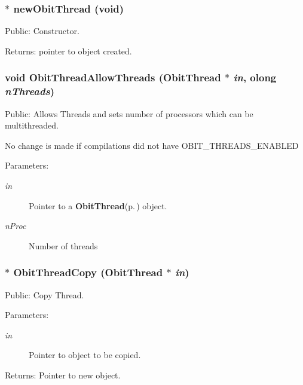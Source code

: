 \subsubsection{$\ast$ new\-Obit\-Thread (void)}\label{ObitThread_8c_a2}


Public: Constructor. 

\begin{Desc}
\item[Returns:]pointer to object created. \end{Desc}
\subsubsection{\setlength{\rightskip}{0pt plus 5cm}void Obit\-Thread\-Allow\-Threads ({\bf Obit\-Thread} $\ast$ {\em in}, {\bf olong} {\em n\-Threads})}\label{ObitThread_8c_a20}


Public: Allows Threads and sets number of processors which can be multithreaded. 

No change is made if compilations did not have OBIT\_\-THREADS\_\-ENABLED \begin{Desc}
\item[Parameters:]
\begin{description}
\item[{\em in}]Pointer to a {\bf Obit\-Thread}{\rm (p.\,\pageref{structObitThread})} object. \item[{\em n\-Proc}]Number of threads \end{description}
\end{Desc}
\subsubsection{$\ast$ Obit\-Thread\-Copy ({\bf Obit\-Thread} $\ast$ {\em in})}\label{ObitThread_8c_a4}


Public: Copy Thread. 

\begin{Desc}
\item[Parameters:]
\begin{description}
\item[{\em in}]Pointer to object to be copied. \end{description}
\end{Desc}
\begin{Desc}
\item[Returns:]Pointer to new object. \end{Desc}
